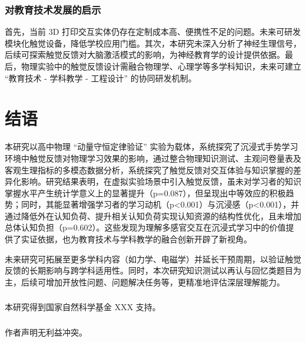 \documentclass[runningheads]{llncs}
\begin{document}
\subsubsection{对教育技术发展的启示}
首先，当前 3D 打印交互实体仍存在定制成本高、便携性不足的问题。未来可研发模块化触觉设备，降低学校应用门槛。其次，本研究未深入分析了神经生理信号，后续可探索触觉反馈对大脑激活模式的影响，为神经教育学的设计提供依据。最后，物理实验中的触觉反馈设计需融合物理学、心理学等多学科知识，未来可建立 “教育技术 - 学科教学 - 工程设计” 的协同研发机制。

\section{结语}
本研究以高中物理 “动量守恒定律验证” 实验为载体，系统探究了沉浸式手势学习环境中触觉反馈对物理学习效果的影响，通过整合物理知识测试、主观问卷量表及客观生理指标的多模态数据分析，系统探究了触觉反馈对交互体验与知识掌握的差异化影响。研究结果表明，在虚拟实验场景中引入触觉反馈，虽未对学习者的知识掌握水平产生统计学意义上的显著提升（p=0.087），但呈现出中等效应的积极趋势；同时，其能显著增强学习者的学习动机（p<0.001）与沉浸感（p<0.001），并通过降低外在认知负荷、提升相关认知负荷实现认知资源的结构性优化，且未增加总体认知负担（p=0.602）。这些发现为理解多感官交互在沉浸式学习中的价值提供了实证依据，也为教育技术与学科教学的融合创新开辟了新视角。

未来研究可拓展至更多学科内容（如力学、电磁学）并延长干预周期，以验证触觉反馈的长期影响与跨学科适用性。同时，本次研究知识测试以再认与回忆类题目为主，后续可增加开放性问题、问题解决任务等，更精准地评估深层理解能力。

\begin{credits}
\subsubsection{\ackname} 
本研究得到国家自然科学基金 XXX 
支持。

\subsubsection{\discintname}
作者声明无利益冲突。
\end{credits}


\end{document}
